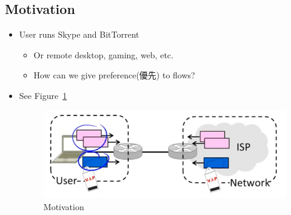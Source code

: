 \documentclass[12pt]{ctexart}   %
\begin{document}
	\subsection{Motivation}
	\begin{itemize}
		\item User runs Skype and BitTorrent
		\begin{itemize}
			\item Or remote desktop, gaming, web, etc.
			\item How can we give preference(優先) to flows?
		\end{itemize}
		\item See Figure~\ref{fig:9-6-2}
		  
		\begin{figure}[h!] %
		\centering
		\includegraphics[scale=0.7]{images/9-6-2}
		\caption{ Motivation }
		\label{fig:9-6-2}
		\end{figure}
	\end{itemize}
\end{document}
